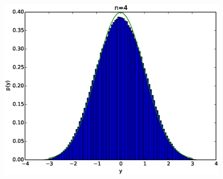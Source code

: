 \documentclass{beamer}
\begin{document}
\begin{frame} 
  \begin{figure}[htp]
\mbox{
\includegraphics[width=0.5\linewidth]{clt3.eps}
}
\end{figure} 
\end{frame}
\end{document}
